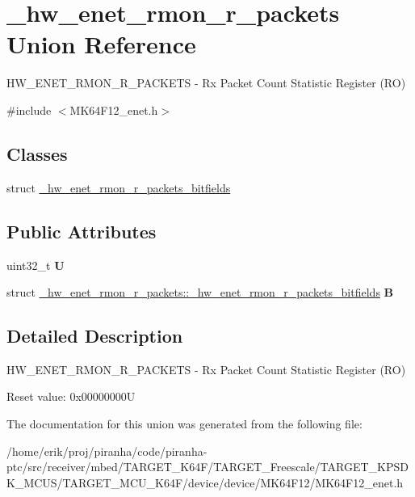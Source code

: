 \hypertarget{union__hw__enet__rmon__r__packets}{}\section{\+\_\+hw\+\_\+enet\+\_\+rmon\+\_\+r\+\_\+packets Union Reference}
\label{union__hw__enet__rmon__r__packets}


H\+W\+\_\+\+E\+N\+E\+T\+\_\+\+R\+M\+O\+N\+\_\+\+R\+\_\+\+P\+A\+C\+K\+E\+TS -\/ Rx Packet Count Statistic Register (RO)  




{\ttfamily \#include $<$M\+K64\+F12\+\_\+enet.\+h$>$}

\subsection*{Classes}
\begin{DoxyCompactItemize}
\item 
struct \hyperlink{struct__hw__enet__rmon__r__packets_1_1__hw__enet__rmon__r__packets__bitfields}{\+\_\+hw\+\_\+enet\+\_\+rmon\+\_\+r\+\_\+packets\+\_\+bitfields}
\end{DoxyCompactItemize}
\subsection*{Public Attributes}
\begin{DoxyCompactItemize}
\item 
uint32\+\_\+t {\bfseries U}\hypertarget{union__hw__enet__rmon__r__packets_ae067b03b8ade61bf1d3653c498759374}{}\label{union__hw__enet__rmon__r__packets_ae067b03b8ade61bf1d3653c498759374}

\item 
struct \hyperlink{struct__hw__enet__rmon__r__packets_1_1__hw__enet__rmon__r__packets__bitfields}{\+\_\+hw\+\_\+enet\+\_\+rmon\+\_\+r\+\_\+packets\+::\+\_\+hw\+\_\+enet\+\_\+rmon\+\_\+r\+\_\+packets\+\_\+bitfields} {\bfseries B}\hypertarget{union__hw__enet__rmon__r__packets_a8cb68e1fe0023e2265b999f817678fb5}{}\label{union__hw__enet__rmon__r__packets_a8cb68e1fe0023e2265b999f817678fb5}

\end{DoxyCompactItemize}


\subsection{Detailed Description}
H\+W\+\_\+\+E\+N\+E\+T\+\_\+\+R\+M\+O\+N\+\_\+\+R\+\_\+\+P\+A\+C\+K\+E\+TS -\/ Rx Packet Count Statistic Register (RO) 

Reset value\+: 0x00000000U 

The documentation for this union was generated from the following file\+:\begin{DoxyCompactItemize}
\item 
/home/erik/proj/piranha/code/piranha-\/ptc/src/receiver/mbed/\+T\+A\+R\+G\+E\+T\+\_\+\+K64\+F/\+T\+A\+R\+G\+E\+T\+\_\+\+Freescale/\+T\+A\+R\+G\+E\+T\+\_\+\+K\+P\+S\+D\+K\+\_\+\+M\+C\+U\+S/\+T\+A\+R\+G\+E\+T\+\_\+\+M\+C\+U\+\_\+\+K64\+F/device/device/\+M\+K64\+F12/M\+K64\+F12\+\_\+enet.\+h\end{DoxyCompactItemize}
